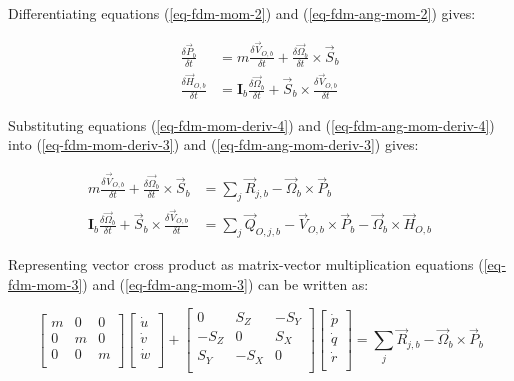 Differentiating equations (\ref{eq-fdm-mom-2}) and (\ref{eq-fdm-ang-mom-2}) gives:

\begin{align}
  \label{eq-fdm-mom-deriv-4}
  \frac{\delta {\vec P}_b}{\delta t}
  &=
  m \frac{\delta {\vec V}_{O,b}}{\delta t}
  +
  \frac{\delta {\vec \Omega}_b}{\delta t}
  \times
  {\vec S}_b \\
  \label{eq-fdm-ang-mom-deriv-4}
  \frac{\delta {\vec H}_{O,b}}{\delta t}
  &=
  {\boldsymbol I}_b \frac{\delta {\vec \Omega}_b}{\delta t}
  +
  {\vec S}_b
  \times
  \frac{\delta {\vec V}_{O,b}}{\delta t}
\end{align}

Substituting equations (\ref{eq-fdm-mom-deriv-4}) and (\ref{eq-fdm-ang-mom-deriv-4}) into (\ref{eq-fdm-mom-deriv-3}) and (\ref{eq-fdm-ang-mom-deriv-3}) gives:

\begin{align}
  \label{eq-fdm-mom-3}
  m \frac{\delta {\vec V}_{O,b}}{\delta t}
  +
  \frac{\delta {\vec \Omega}_b}{\delta t} \times {\vec S}_b
  &=
  \sum_{j} {\vec R}_{j,b}
  -
  {\vec \Omega}_b \times {\vec P}_b \\
  \label{eq-fdm-ang-mom-3}
  {\boldsymbol I}_b \frac{\delta {\vec \Omega}_b}{\delta t}
  +
  {\vec S}_b \times \frac{\delta {\vec V}_{O,b}}{\delta t}
  &=
  \sum_{j} {\vec Q}_{O,j,b}
  -
  {\vec V}_{O,b} \times {\vec P}_b
  -
  {\vec \Omega}_b \times {\vec H}_{O,b}
\end{align}

Representing vector cross product as matrix-vector multiplication equations (\ref{eq-fdm-mom-3}) and (\ref{eq-fdm-ang-mom-3}) can be written as:

\begin{equation}
  \label{eq-fdm-mom-4}
  \left[
    \begin{matrix}
      m & 0 & 0 \\
      0 & m & 0 \\
      0 & 0 & m \\
    \end{matrix}
  \right]
  \left[
    \begin{matrix}
      \dot u \\
      \dot v \\
      \dot w \\
    \end{matrix}
  \right]
  +
  \left[
    \begin{matrix}
         0 &  S_Z & -S_Y \\
      -S_Z &    0 &  S_X \\
       S_Y & -S_X &    0 \\
    \end{matrix}
  \right]
  \left[
    \begin{matrix}
      \dot p \\
      \dot q \\
      \dot r \\
    \end{matrix}
  \right]
  =
  \sum_{j} {\vec R}_{j,b} - {\vec \Omega}_b \times {\vec P}_b
\end{equation}

